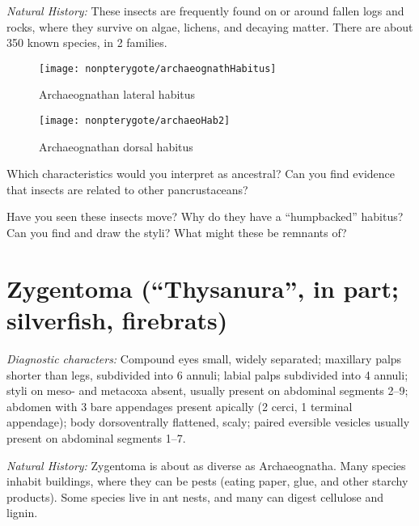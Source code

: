 \noindent{}\textit{Natural History:} These insects are frequently found on or around fallen logs and rocks, where they survive on algae, lichens, and decaying matter. There are about 350 known species, in 2 families.\vspace{3mm}

\begin{figure}[ht!]
  \centering
    \texttt{[image: nonpterygote/archaeognathHabitus]}
  \caption{Archaeognathan lateral habitus \cite[redrawn from][Fig. 1]{bhlitem30465Insects}}
  \label{fig:archhabit}
\end{figure}

\begin{figure}[ht!]
  \centering
    \texttt{[image: nonpterygote/archaeoHab2]}
  \caption{Archaeognathan dorsal habitus \citep[][Plate 53]{bhlitem43892Lubbock}}
  \label{fig:archhead}
\end{figure}

\begin{theo}
{}Which characteristics would you interpret as ancestral? Can you find evidence that insects are related to other pancrustaceans?\vspace{3mm}

\noindent{}Have you seen these insects move? Why do they have a ``humpbacked'' habitus? Can you find and draw the styli? What might these be remnants of? \end{theo}

\section{Zygentoma (``Thysanura'', in part; silverfish, firebrats)}

\noindent{}\textit{Diagnostic characters:} Compound eyes small, widely separated; maxillary palps shorter than legs, subdivided into 6 annuli; labial palps subdivided into 4 annuli; styli on meso- and metacoxa absent, usually present on abdominal segments 2--9; abdomen with 3 bare appendages present apically (2 cerci, 1 terminal appendage); body dorsoventrally flattened, scaly; paired eversible vesicles usually present on abdominal segments 1--7.\vspace{3mm}

\noindent{}\textit{Natural History:} Zygentoma is about as diverse as Archaeognatha. Many species inhabit buildings, where they can be pests (eating paper, glue, and other starchy products). Some species live in ant nests, and many can digest cellulose and lignin.\vspace{3mm}

